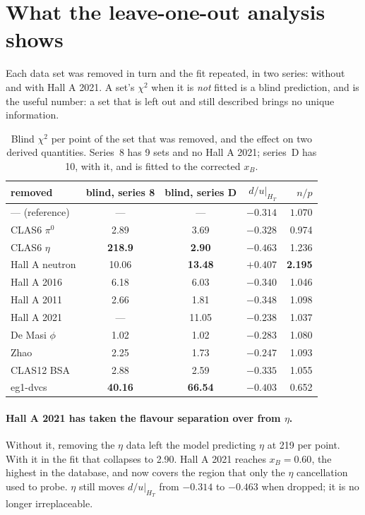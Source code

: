 \documentclass[11pt,a4paper]{article}
\begin{document}
\section{What the leave-one-out analysis shows}

Each data set was removed in turn and the fit repeated, in two series: without
and with Hall A 2021.  A set's $\chi^2$ when it is \emph{not} fitted is a blind
prediction, and is the useful number: a set that is left out and still
described brings no unique information.

\begin{table}[htb]
\centering\small
\caption{Blind $\chi^2$ per point of the set that was removed, and the effect
on two derived quantities.  Series~8 has 9 sets and no Hall A 2021; series~D has 10, with it, and is fitted to the corrected $x_B$.}
\label{tab:loo}
\begin{tabular}{lccrr}
\toprule
removed & blind, series 8 & blind, series D & $d/u|_{H_T}$ & $n/p$\\
\midrule
--- (reference) & --- & --- & $-0.314$ & $1.070$\\
CLAS6 $\pi^0$ & 2.89 & 3.69 & $-0.328$ & 0.974\\
CLAS6 $\eta$ & \textbf{218.9} & \textbf{2.90} & $-0.463$ & 1.236\\
Hall A neutron & 10.06 & \textbf{13.48} & $+0.407$ & \textbf{2.195}\\
Hall A 2016 & 6.18 & 6.03 & $-0.340$ & 1.046\\
Hall A 2011 & 2.66 & 1.81 & $-0.348$ & 1.098\\
Hall A 2021 & --- & 11.05 & $-0.238$ & 1.037\\
De Masi $\phi$ & 1.02 & 1.02 & $-0.283$ & 1.080\\
Zhao & 2.25 & 1.73 & $-0.247$ & 1.093\\
CLAS12 BSA & 2.88 & 2.59 & $-0.335$ & 1.055\\
eg1-dvcs & \textbf{40.16} & \textbf{66.54} & $-0.403$ & 0.652\\
\bottomrule
\end{tabular}
\end{table}

\paragraph{Hall A 2021 has taken the flavour separation over from $\eta$.}
Without it, removing the $\eta$ data left the model predicting $\eta$ at 219
per point.  With it in the fit that collapses to 2.90.  Hall A 2021 reaches
$x_B = 0.60$, the highest in the database, and now covers the region that only
the $\eta$ cancellation used to probe.  $\eta$ still moves $d/u|_{H_T}$ from
$-0.314$ to $-0.463$ when dropped; it is no longer irreplaceable.
\end{document}
